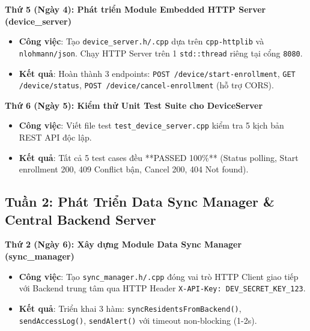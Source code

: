 \documentclass[12pt,a4paper]{article}
\begin{document}
\begin{daybox}
\textbf{Thứ 5 (Ngày 4): Phát triển Module Embedded HTTP Server (device\_server)}
\begin{itemize}[leftmargin=*]
    \item \textbf{Công việc}: Tạo \texttt{device\_server.h/.cpp} dựa trên \texttt{cpp-httplib} và \texttt{nlohmann/json}. Chạy HTTP Server trên 1 \texttt{std::thread} riêng tại cổng \texttt{8080}.
    \item \textbf{Kết quả}: Hoàn thành 3 endpoints: \texttt{POST /device/start-enrollment}, \texttt{GET /device/status}, \texttt{POST /device/cancel-enrollment} (hỗ trợ CORS).
\end{itemize}
\end{daybox}

\begin{daybox}
\textbf{Thứ 6 (Ngày 5): Kiểm thử Unit Test Suite cho DeviceServer}
\begin{itemize}[leftmargin=*]
    \item \textbf{Công việc}: Viết file test \texttt{test\_device_server.cpp} kiểm tra 5 kịch bản REST API độc lập.
    \item \textbf{Kết quả}: Tất cả 5 test cases đều **PASSED 100\%** (Status polling, Start enrollment 200, 409 Conflict bận, Cancel 200, 404 Not found).
\end{itemize}
\end{daybox}

\subsection{Tuần 2: Phát Triển Data Sync Manager \& Central Backend Server}

\begin{daybox}
\textbf{Thứ 2 (Ngày 6): Xây dựng Module Data Sync Manager (sync\_manager)}
\begin{itemize}[leftmargin=*]
    \item \textbf{Công việc}: Tạo \texttt{sync\_manager.h/.cpp} đóng vai trò HTTP Client giao tiếp với Backend trung tâm qua HTTP Header \texttt{X-API-Key: DEV\_SECRET\_KEY\_123}.
    \item \textbf{Kết quả}: Triển khai 3 hàm: \texttt{syncResidentsFromBackend()}, \texttt{sendAccessLog()}, \texttt{sendAlert()} với timeout non-blocking (1-2s).
\end{itemize}
\end{daybox}
\end{document}
